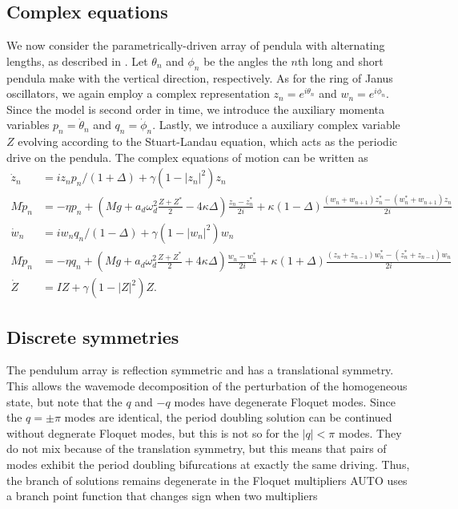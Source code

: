 \documentclass[aps,pre,amsmath,amssymb,floatfix,onecolumn,notitlepage,10pt]{revtex4-1}
\begin{document}
\subsection{Complex equations}
We now consider the parametrically-driven array of pendula with alternating lengths, as described in \cite{2021_Nicolaou_1,2021_Nicolaou_2}.  Let $\theta_n$ and $\phi_n$ be the angles the $n$th long and short pendula make with the vertical direction, respectively. As for the ring of Janus oscillators, we again employ a complex representation $z_n=e^{i\theta_n}$ and $w_n=e^{i\phi_n}$. Since the model is second order in time, we introduce the auxiliary momenta variables $p_n = \dot{\theta}_n$ and $q_n=\dot{\phi}_n$.  Lastly, we introduce a auxiliary complex variable $Z$ evolving according to the Stuart-Landau equation, which acts as the periodic drive on the pendula. The complex equations of motion can be written as
\begin{align}
\dot{z}_n&=iz_np_n/(1+\Delta)+\gamma(1-|z_n|^2)z_n \\
M\dot{p}_n&=-\eta p_n+(Mg+a_d\omega_d^2\frac{Z+Z^*}{2}-4\kappa\Delta)\frac{z_n-z_n^*}{2i} +\kappa(1-\Delta)\frac{(w_n+w_{n+1})z_n^*-(w_n^*+w_{n+1})z_n}{2i} \\
\dot{w}_n&=iw_nq_n/(1-\Delta)+\gamma(1-|w_n|^2)w_n \\
M\dot{p}_n&=-\eta q_n+(Mg+a_d\omega_d^2\frac{Z+Z^*}{2}+4\kappa\Delta)\frac{w_n-w_n^*}{2i} +\kappa(1+\Delta)\frac{(z_n+z_{n-1})w_n^*-(z_n^*+z_{n-1})w_n}{2i}\\
\dot{Z}&=IZ+\gamma(1-|Z|^2)Z.
\end{align}

\subsection{Discrete symmetries}
The pendulum array is reflection symmetric and has a translational symmetry. This allows the wavemode decomposition of the perturbation of the homogeneous state, but note that the $q$ and $-q$ modes have degenerate Floquet modes. Since the $q=\pm\pi$ modes are identical, the period doubling solution can be continued without degnerate Floquet modes, but this is not so for the $|q|<\pi$ modes. They do not mix because of the translation symmetry, but this means that pairs of modes exhibit the period doubling bifurcations at exactly the same driving.  Thus, the branch of solutions remains degenerate in the Floquet multipliers AUTO uses a branch point function that changes sign when two multipliers
\end{document}
